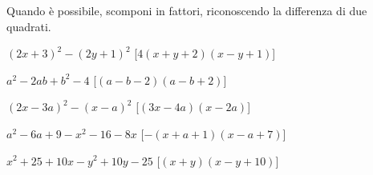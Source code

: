 
\begin{esercizio}[\Ast]
\label{ese:div.019}
Quando è possibile, scomponi in fattori, riconoscendo la differenza di due 
quadrati.
\begin{enumeratea}
 \item \((2x+3)^{2}-(2y+1)^{2}\) \hfill [\(4(x+y+2)(x-y+1)\)]
 \item \(a^{2}-2{ab}+b^{2}-4\) \hfill [\((a-b-2)(a-b+2)\)]
 \item \((2x-3a)^{2}-(x-a)^{2}\) \hfill [\((3x-4a)(x-2a)\)]
 \item \(a^{2}-6a+9-x^{2}-16-8x\) \hfill [\(-(x+a+1)(x-a+7)\)]
 \item \(x^{2}+25+10x-y^{2}+10y-25\) \hfill [\((x+y)(x-y+10)\)]
\end{enumeratea}
\end{esercizio}

